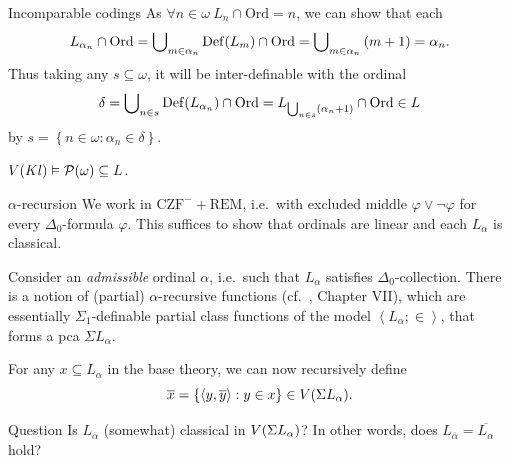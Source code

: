 \documentclass{beamer}
\newcommand\tuple[1]{\left\langle #1 \right\rangle}
\begin{document}
\begin{frame}{Incomparable codings}
  As $\forall n \in \omega \ L_n \cap \mathrm{Ord} = n$, we can show that each
  \[L_{\alpha_n} \cap \mathrm{Ord} = \bigcup\nolimits_{m \in \alpha_n} \mathrm{Def}\mleft(L_m\mright) \cap \mathrm{Ord} = \bigcup\nolimits_{m \in \alpha_n} \left(m + 1\right) = \alpha_n.\]
  Thus taking any $s \subseteq \omega$, it will be inter-definable with the ordinal
  \[\delta = \bigcup\nolimits_{n \in s} \mathrm{Def}\mleft(L_{\alpha_n}\mright) \cap \mathrm{Ord} = L_{\bigcup\nolimits_{n \in s} \left(\alpha_n + 1\right)} \cap \mathrm{Ord} \in L\]
  by $s = \left\{n \in \omega : \alpha_n \in \delta\right\}$.

  \vspace{1em}

  \begin{theorem}
    $V\mleft(Kl\mright) \vDash \mathcal{P}\mleft(\omega\mright) \subseteq L$.
  \end{theorem}
\end{frame}

\begin{frame}{$\alpha$-recursion}
  We work in $\mathrm{CZF}^- + \mathrm{REM}$, i.e.\ with excluded middle $\varphi \lor \neg \varphi$ for every $\Delta_0$-formula $\varphi$. This suffices to show that ordinals are linear and each $L_\alpha$ is classical.

  \vspace{1em}

  Consider an \emph{admissible} ordinal $\alpha$, i.e.\ such that $L_\alpha$ satisfies $\Delta_0$-collection. There is a notion of (partial) $\alpha$-recursive functions (cf.\ , Chapter VII), which are essentially $\Sigma_1$-definable partial class functions of the model $\tuple{L_\alpha; \in}$, that forms a pca $\Sigma L_\alpha$.

  \pause

  \vspace{1em}

  For any $x \subseteq L_\alpha$ in the base theory, we can now recursively define
  \[\overline{x} = \left\{\tuple{y, \overline{y}} : y \in x\right\} \in V\mleft(\Sigma L_\alpha\mright).\]

  \begin{block}{Question}
    Is $L_{\overline{\alpha}}$ (somewhat) classical in $V\mleft(\Sigma L_\alpha\mright)$? In other words, does $L_{\overline{\alpha}} = \overline{L_\alpha}$ hold?
  \end{block}
\end{frame}
\end{document}

